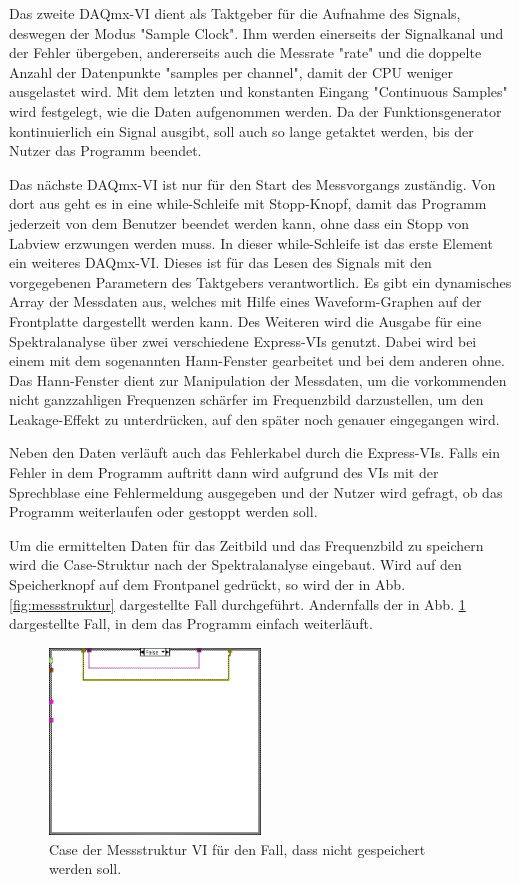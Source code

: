 		Das zweite DAQmx-VI dient als Taktgeber für die Aufnahme des Signals, deswegen der Modus "Sample Clock".
		Ihm werden einerseits der Signalkanal und der Fehler übergeben, andererseits auch die Messrate "rate" und die doppelte Anzahl der Datenpunkte "samples per channel", damit der CPU weniger ausgelastet wird. 
		Mit dem letzten und konstanten Eingang "Continuous Samples" wird festgelegt, wie die Daten aufgenommen werden.
		Da der Funktionsgenerator kontinuierlich ein Signal ausgibt, soll auch so lange getaktet werden, bis der Nutzer das Programm beendet.
		
		Das nächste DAQmx-VI ist nur für den Start des Messvorgangs zuständig.
		Von dort aus geht es in eine while-Schleife mit Stopp-Knopf, damit das Programm jederzeit von dem Benutzer beendet werden kann, ohne dass ein Stopp von Labview erzwungen werden muss.
		In dieser while-Schleife ist das erste Element ein weiteres DAQmx-VI.
		Dieses ist für das Lesen des Signals mit den vorgegebenen Parametern des Taktgebers verantwortlich.
		Es gibt ein dynamisches Array der Messdaten aus, welches mit Hilfe eines Waveform-Graphen auf der Frontplatte dargestellt werden kann.  
		Des Weiteren wird die Ausgabe für eine Spektralanalyse über zwei verschiedene Express-VIs genutzt. 
		Dabei wird bei einem mit dem sogenannten Hann-Fenster gearbeitet und bei dem anderen ohne.
		Das Hann-Fenster dient zur Manipulation der Messdaten, um die vorkommenden nicht ganzzahligen Frequenzen schärfer im Frequenzbild darzustellen, um den Leakage-Effekt zu unterdrücken, auf den später noch genauer eingegangen wird.
		
		Neben den Daten verläuft auch das Fehlerkabel durch die Express-VIs. 
		Falls ein Fehler in dem Programm auftritt dann wird aufgrund des VIs mit der Sprechblase eine Fehlermeldung ausgegeben und der Nutzer wird gefragt, ob das Programm weiterlaufen oder gestoppt werden soll.
		
		Um die ermittelten Daten für das Zeitbild und das Frequenzbild zu speichern wird die Case-Struktur nach der Spektralanalyse eingebaut.
		Wird auf den Speicherknopf auf dem Frontpanel gedrückt, so wird der in Abb. \ref{fig:messstruktur} dargestellte Fall durchgeführt.
		Andernfalls der in Abb. \ref{fig:messstruktur_case} dargestellte Fall, in dem das Programm einfach weiterläuft.
		\begin{figure}[H]
			\centering
			\includegraphics[width=0.5\textwidth]{pic/messstruktur_case.png}	
			\caption{Case der Messstruktur VI für den Fall, dass nicht gespeichert werden soll.}
			\label{fig:messstruktur_case}
		\end{figure}
	
